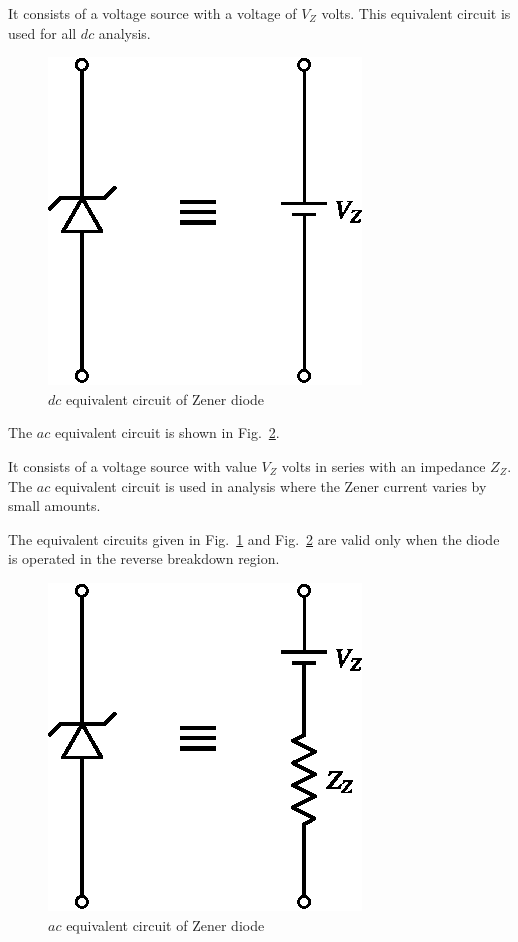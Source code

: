 It consists of a voltage source with a voltage of $V_{Z}$ volts. This equivalent circuit is used for all $dc$ analysis.
\begin{figure}[H]
\centering
\includegraphics{chap1/fig1.29.eps}
\caption{$dc$ equivalent circuit of Zener diode}\label{fig1.29}
\end{figure}

The $ac$ equivalent circuit is shown in Fig.~\ref{fig1.30}.

It consists of a voltage source with value $V_{Z}$ volts in series with an impedance $Z_{Z}$. The $ac$ equivalent circuit is used in analysis where the Zener current varies by small amounts.

The equivalent circuits given in Fig.~\ref{fig1.29} and Fig.~\ref{fig1.30} are valid only when the diode is operated in the reverse breakdown region.
\begin{figure}[H]
\centering
\includegraphics{chap1/fig1.30.eps}
\caption{$ac$ equivalent circuit of Zener diode}\label{fig1.30}
\end{figure}

